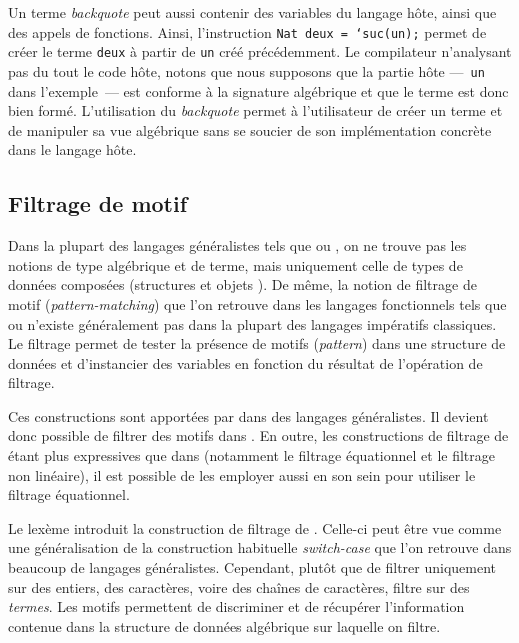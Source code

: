 Un terme \emph{backquote} peut aussi contenir des variables du langage hôte,
ainsi que des appels de fonctions. Ainsi, l'instruction \texttt{Nat deux =
`suc(un);} permet de créer le terme \texttt{deux} à partir de \texttt{un} créé
précédemment. Le compilateur {\tom} n'analysant pas du tout le code hôte,
notons que nous supposons que la partie hôte ---~\texttt{un} dans l'exemple~---
est conforme à la signature algébrique et que le terme est donc bien formé.
L'utilisation du \emph{backquote} permet à l'utilisateur %
de créer un terme et de manipuler sa vue algébrique sans se soucier de
son implémentation concrète dans le langage hôte.



\subsection{Filtrage de motif}
\label{subsec:matching}

Dans la plupart des langages généralistes tels que {\C} ou {\java}, on ne
trouve pas les notions de type algébrique et de terme, mais uniquement celle de
types de données composées (structures {\C} et objets {\java}). De même, la
notion de filtrage de motif (\emph{pattern-matching}) que l'on retrouve dans
les langages fonctionnels tels que {\caml} ou {\haskell} n'existe généralement
pas dans la plupart des langages impératifs classiques. Le filtrage permet de
tester la présence de motifs (\emph{pattern}) dans une structure de données et
d'instancier des variables en fonction du résultat de l'opération de filtrage.

Ces constructions sont apportées par {\tom} dans des langages généralistes. Il
devient donc possible de filtrer des motifs dans {\java}. En outre, les
constructions de filtrage de {\tom} étant plus expressives que dans {\caml}
(notamment le filtrage équationnel et le filtrage non linéaire), il
est possible de les employer aussi en son sein pour utiliser le filtrage
équationnel.


Le lexème  introduit la construction de
filtrage de {\tom}. Celle-ci peut être vue comme une généralisation de la
construction habituelle \emph{switch-case} que l'on retrouve dans beaucoup de
langages généralistes.  Cependant, plutôt que de filtrer uniquement sur des
entiers, des caractères, voire des chaînes de caractères, {\tom} filtre sur des
\emph{termes}. Les motifs permettent de discriminer et de récupérer
l'information contenue dans la structure de données algébrique sur laquelle on
filtre.

